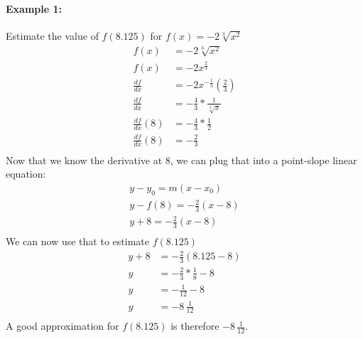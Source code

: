 \documentclass[../revisedmain.tex]{subfiles}
\begin{document}
\paragraph{Example 1:}Estimate the value of $f(8.125)$ for $f(x)=-2\sqrt[3]{x^2}$
\begin{equation}
	\begin{split}
	f(x)&=-2\sqrt[3]{x^2}\\
	f(x)&=-2x^{\frac{2}{3}}\\
	\frac{df}{dx}&=-2x^{-\frac{1}{3}}\left(\frac{2}{3}\right)\\
	\frac{df}{dx}&=-\frac{4}{3}*\frac{1}{\sqrt[3]{x}}\\
	\frac{df}{dx}(8)&=-\frac{4}{3}*\frac{1}{2}\\
	\frac{df}{dx}(8)&=-\frac{2}{3}\\
	\end{split}
\end{equation}Now that we know the derivative at 8, we can plug that into a point-slope linear equation:
\begin{gather*}
	y-y_0=m(x-x_0)\\
	y-f(8)=-\frac{2}{3}(x-8)\\
	y+8=-\frac{2}{3}(x-8)\\
\end{gather*}We can now use that to estimate $f(8.125)$
\begin{equation}
	\begin{split}
	y+8&=-\frac{2}{3}(8.125-8)\\
	y&=-\frac{2}{3}*\frac{1}{8}-8\\
	y&=-\frac{1}{12}-8\\
	y&=-8\,\frac{1}{12}\\
	\end{split}
\end{equation} A good approximation for $f(8.125)$ is therefore $-8\,\displaystyle\frac{1}{12}$.\\
\end{document}
